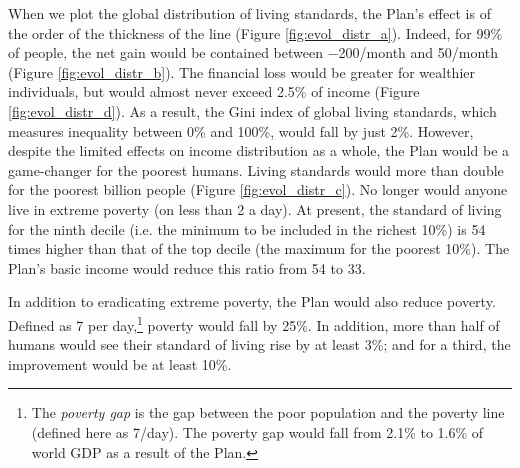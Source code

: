 \documentclass[a5paper,english,openany]{memoir}
\begin{document}


When we plot the global distribution of living standards, the Plan's effect is of the order of the thickness of the line (Figure \ref{fig:evol_distr_a}). Indeed, for 99\% of people, the net gain would be contained between $-$200\textit{\texteuro{}}/month and 50\textit{\texteuro{}}/month (Figure \ref{fig:evol_distr_b}). The financial loss would be greater for wealthier individuals, but would almost never exceed 2.5\% of income (Figure \ref{fig:evol_distr_d}). As a result, the Gini index of global living standards, which measures inequality between 0\% and 100\%, would fall by just 2\%. 
However, despite the limited effects on income distribution as a whole, the Plan would be a game-changer for the poorest humans. Living standards would more than double for the poorest billion people (Figure \ref{fig:evol_distr_c}). No longer would anyone live in extreme poverty (on less than \textit{\texteuro{}}2 a day). 
At present, the standard of living for the %
ninth decile (i.e. the minimum to be included in the richest 10\%) is 54 times higher than that of the top %
decile (the maximum for the poorest 10\%). The Plan's basic income would reduce this ratio from 54 to 33. 

In addition to eradicating extreme poverty, the Plan would also reduce poverty. Defined as \textit{\texteuro{}}7 per day,\footnote{The \textit{poverty gap} is the gap between the poor population and the poverty line (defined here as \textit{\texteuro{}}7/day). The poverty gap would fall from 2.1\% to 1.6\% of world GDP as a result of the Plan.} poverty would fall by 25\%. 
In addition, more than half of humans would see their standard of living rise by at least 3\%; and for a third, the improvement would be at least 10\%. 
\end{document}
